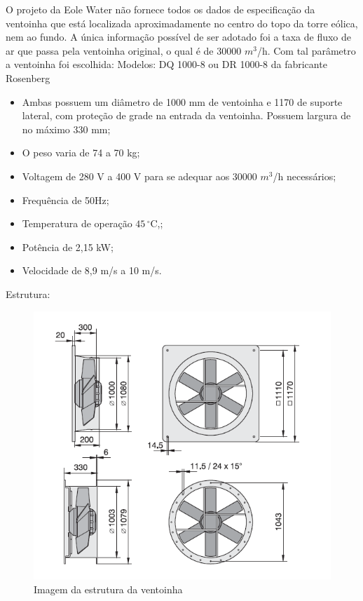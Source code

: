 O projeto da Eole Water não fornece todos os dados de especificação da ventoinha que está localizada aproximadamente no centro do topo da torre eólica, nem ao fundo. A única informação possível de ser adotado foi a taxa de fluxo de ar que passa pela ventoinha original, o qual é de 30000 $m^3$/h. 
	Com tal parâmetro a ventoinha foi escolhida:
	Modelos: DQ 1000-8 ou DR 1000-8  da fabricante Rosenberg\cite{axair}
	
	\begin{itemize}
		
		\item Ambas possuem um diâmetro de 1000 mm de ventoinha e 1170 de suporte lateral, com proteção de grade na entrada da ventoinha. Possuem largura de no máximo 330 mm;
		\item O peso varia de 74 a 70 kg;
		\item Voltagem de 280 V a 400 V para se adequar aos 30000 $m^3$/h necessários;
		\item Frequência de 50Hz;
		\item Temperatura de operação $45\,^{\circ}\mathrm{C}$,;
		\item Potência de 2,15 kW;
		\item Velocidade de 8,9 m/s a 10 m/s.		
	\end{itemize}
	
Estrutura:

	\begin{figure}[!htbp]
	 \centering
	  \includegraphics[scale=0.5]{editaveis/figuras/estrutura_ventoinha}
	  \caption[Imagem da estrutura da ventoinha]{Imagem da estrutura da ventoinha\footnotemark}
	  \label{estrutura_ventoinha}
	\end{figure}
	\FloatBarrier
	
